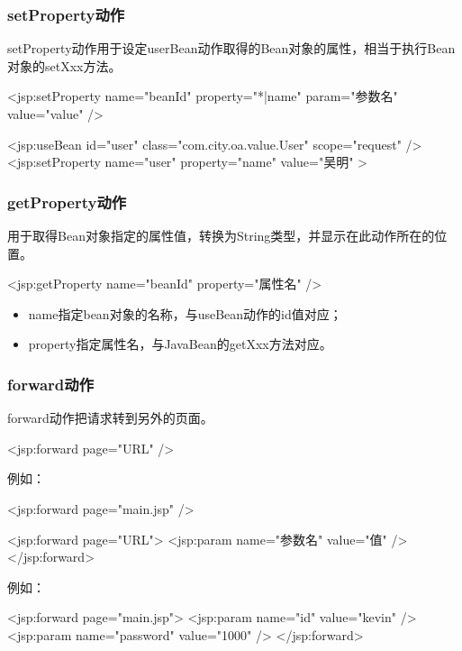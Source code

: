 \begin{frame}[fragile] %
  \frametitle{setProperty动作} 

  setProperty动作用于设定userBean动作取得的Bean对象的属性，相当于执行Bean对象的setXxx方法。

  \begin{jspCode}
    <jsp:setProperty name="beanId" property="*|name" param="参数名" value="value" />
  \end{jspCode}

  \begin{jspCode}
    <jsp:useBean id="user" class="com.city.oa.value.User" scope="request" />
    <jsp:setProperty name="user" property="name" value="吴明" >
  \end{jspCode}
\end{frame}

\begin{frame}[fragile] %
  \frametitle{getProperty动作} 

  用于取得Bean对象指定的属性值，转换为String类型，并显示在此动作所在的位置。

  \begin{jspCode}
    <jsp:getProperty name="beanId" property="属性名" />
  \end{jspCode}

  \begin{itemize}
  \item name指定bean对象的名称，与useBean动作的id值对应；
  \item property指定属性名，与JavaBean的getXxx方法对应。
  \end{itemize}
\end{frame}


\begin{frame}[fragile] %
  \frametitle{forward动作} 
  forward动作把请求转到另外的页面。

  \begin{jspCode}
    <jsp:forward page="URL" />
  \end{jspCode}

  例如：
  \begin{jspCode}
    <jsp:forward page="main.jsp" />  
  \end{jspCode}

  
  \begin{jspCode}
    <jsp:forward page="URL">
      <jsp:param name="参数名" value="值" />
    </jsp:forward>
  \end{jspCode}
  
  例如：
  \begin{jspCode}
    <jsp:forward page="main.jsp">
      <jsp:param name="id" value="kevin" />
      <jsp:param name="password" value="1000" />
    </jsp:forward>
  \end{jspCode}
\end{frame}

